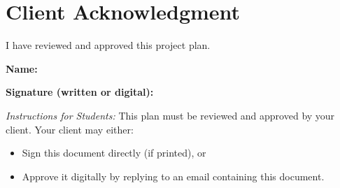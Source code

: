 \documentclass{article}
\begin{document}
\section*{Client Acknowledgment}
I have reviewed and approved this project plan.  

\vspace{1em}
\noindent\textbf{Name:} \underline{\hspace{7cm}}  

\vspace{1em}
\noindent\textbf{Signature (written or digital):} \underline{\hspace{7cm}}  

\vspace{2em}
\noindent\textit{Instructions for Students:}  
This plan must be reviewed and approved by your client.  
Your client may either:  
\begin{itemize}
    \item Sign this document directly (if printed), or  
    \item Approve it digitally by replying to an email containing this document.  
\end{itemize}
\end{document}
